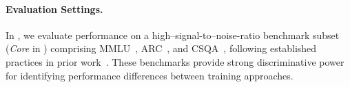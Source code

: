 \paragraph{Evaluation Settings.}
In , we evaluate performance on a high–signal-to–noise-ratio benchmark subset (\textit{Core} in ) comprising MMLU~\citep{mmlu}, ARC~\citep{arc}, and CSQA~\citep{commonsenseqa}, following established practices in prior work~\citep{heineman2025signalnoiseframeworkreducing,luo2025learningratedecaywastes}. These benchmarks provide strong discriminative power for identifying performance differences between training approaches.
























